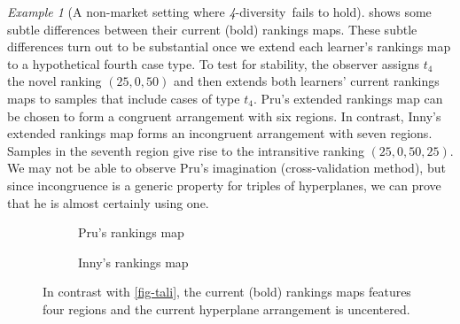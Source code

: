 \documentclass[ecta,nameyear,draft]{econsocart}
\newcommand{\fourdiv}{\textit{4}-\textup{diversity}}
\newcommand{\threediv}{\textit{3}-\textup{diversity}}
\theoremstyle{plain}
\theoremstyle{remark}
\newtheorem{example}{Example}%
\begin{document}
\begin{example}[A non-market setting where \fourdiv\ fails to hold]
   shows some subtle differences between their current (bold)
  rankings maps.  These subtle differences turn out to be substantial once we
  extend each learner's rankings map to a hypothetical fourth case type.  To
  test for stability, the observer assigns $t_4$ the novel ranking $\left({25},
  {0}, {50}\right)$ and then extends both learners' current rankings maps to
  samples that include cases of type $t_4$.  {Pru}'s extended rankings map can
  be chosen to form a congruent arrangement with six regions. In contrast,
  Inny's extended rankings map forms an incongruent arrangement with seven
  regions.  Samples in the seventh region give rise to the intransitive ranking
  $\left({25}, {0}, {50}, {25}\right)$.
  We may not be able to observe {Pru}'s imagination (cross-validation method),
  but since incongruence is a generic property for triples of hyperplanes, we
  can prove that he is almost certainly using one.
  \begin{figure}[ht] \centering
    \begin{subfigure}{.5\textwidth} \def \congruent{1} \centering
       \caption{\label{fig-rates-prati} {Pru}'s
      rankings map}
    \end{subfigure}%
    \begin{subfigure}{.5\textwidth} \def \congruent{0} \centering
       \caption{\label{fig-rates-sempi} Inny's
      rankings map}
    \end{subfigure}
    \caption{\label{fig-rates} In contrast with \cref{fig-tali}, the current
      (bold) rankings maps features four regions and the current hyperplane
    arrangement is uncentered. }
  \end{figure}
\end{example}
\end{document}
